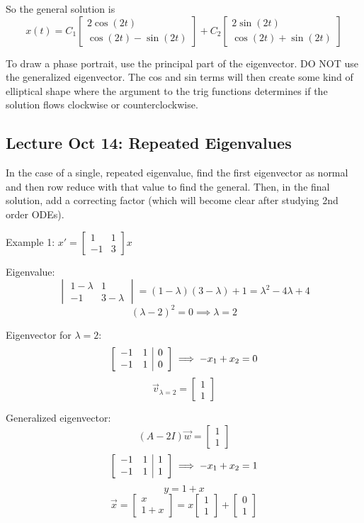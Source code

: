 \documentclass[12pt]{article}
\begin{document}
So the general solution is 
\[\boxed{x(t) = C_1 \begin{bmatrix}
    2\cos (2t)\\
    \cos(2t) - \sin (2t)
\end{bmatrix} + C_2 \begin{bmatrix}
    2 \sin (2t)\\
    \cos(2t) + \sin(2t)
\end{bmatrix}}\]

To draw a phase portrait, use the principal part of the eigenvector. DO NOT use the generalized eigenvector. The cos and sin terms will then create some kind of elliptical shape where the argument to the trig functions determines if the solution flows clockwise or counterclockwise. 

\subsection*{Lecture Oct 14: Repeated Eigenvalues}
In the case of a single, repeated eigenvalue, find the first eigenvector as normal and then row reduce with that value to find the general. Then, in the final solution, add a correcting factor (which will become clear after studying 2nd order ODEs).

Example 1: $x' = \begin{bmatrix}
    1 & 1\\
    -1 & 3
\end{bmatrix}x$

Eigenvalue:
\[\begin{vmatrix}
    1 - \lambda & 1\\
    -1 & 3 - \lambda
\end{vmatrix} = (1 - \lambda)(3 - \lambda) + 1 = \lambda^2 -4\lambda + 4\]
\[(\lambda - 2)^2 = 0 \implies \lambda = 2\]

Eigenvector for $\lambda = 2$:
\[\left[\begin{array}{c c | c}
    -1 & 1 & 0\\
    -1 & 1 & 0
\end{array}\right] \implies -x_1 + x_2 = 0\]
\[\vec{v}_{\lambda = 2} = \begin{bmatrix}
    1\\1
\end{bmatrix}\]

Generalized eigenvector:
\[(A - 2I)\vec{w} = \begin{bmatrix}
    1\\1
\end{bmatrix}\]
\[\left[\begin{array}{c c |c}
    -1 & 1 & 1\\
    -1 & 1 & 1
\end{array}\right] \implies -x_1 + x_2 = 1\]
\[y = 1 + x\]
\[\vec{x} = \begin{bmatrix}
    x\\
    1 + x
\end{bmatrix} = x \begin{bmatrix}
    1\\1
\end{bmatrix} + \begin{bmatrix}
    0\\1
\end{bmatrix}\]
\end{document}
